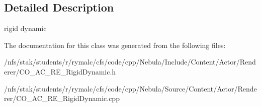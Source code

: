 \subsection{Detailed Description}
rigid dynamic 

The documentation for this class was generated from the following files:\begin{DoxyCompactItemize}
\item 
/nfs/stak/students/r/rymalc/cfs/code/cpp/Nebula/Include/Content/Actor/Renderer/CO\_\-AC\_\-RE\_\-RigidDynamic.h\item 
/nfs/stak/students/r/rymalc/cfs/code/cpp/Nebula/Source/Content/Actor/Renderer/CO\_\-AC\_\-RE\_\-RigidDynamic.cpp\end{DoxyCompactItemize}
